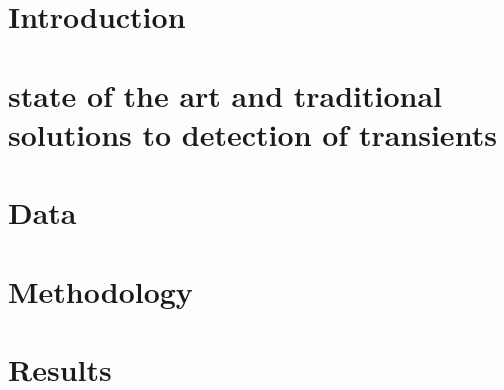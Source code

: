 \documentclass[linenumbers, twocolumn]{aastex631}
\begin{document}

\section{Introduction} \label{sec:intro}



\section{state of the art and traditional solutions to detection of transients}\label{sec:stateofart}


\section{Data} \label{sec:data}


\section{Methodology}\label{sec:method}


\section{Results}\label{sec:results}

\end{document}
